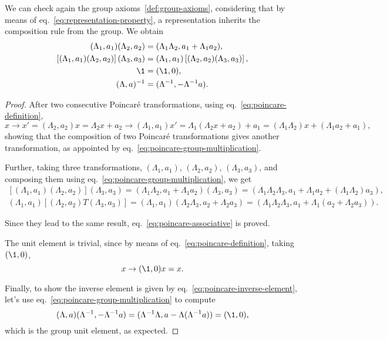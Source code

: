 We can check again the group axioms~\ref{def:group-axioms}, considering that by means of eq.~\eqref{eq:representation-property}, a representation inherits the composition rule from the group. We obtain
\begin{subequations}
\begin{align}
    (\Lambda_1, a_1) (\Lambda_2, a_2) &= (\Lambda_1 \Lambda_2, a_1 + \Lambda_1 a_2), \label{eq:poincare-group-multiplication} \\
    \left[(\Lambda_1,a_1)(\Lambda_2,a_2)\right] (\Lambda_3,a_3) &= (\Lambda_1, a_1) \left[ (\Lambda_2,a_2)(\Lambda_3,a_3) \right], \label{eq:poincare-associative} \\
    \1 &= (\1, 0) ,\label{eq:poincare-unit-element} \\
    (\Lambda, a)^{-1} &= (\Lambda^{-1}, -\Lambda^{-1}a). \label{eq:poincare-inverse-element}
\end{align}
\end{subequations}
\begin{proof}
    After two consecutive Poincaré transformations, using eq.~\eqref{eq:poincare-definition},
    \begin{equation*}
        x \to x' = (\Lambda_2,a_2)x = \Lambda_2 x + a_2 \to (\Lambda_1,a_1) x' = \Lambda_1 (\Lambda_2 x + a_2) + a_1 = (\Lambda_1 \Lambda_2) x + (\Lambda_1 a_2 + a_1) ,
    \end{equation*}
    showing that the composition of two Poincaré transformations gives another transformation, as appointed by eq.~\eqref{eq:poincare-group-multiplication}.

    Further, taking three transformations, $(\Lambda_1,a_1)$, $(\Lambda_2,a_2)$, $(\Lambda_3,a_3)$, and composing them using eq.~\eqref{eq:poincare-group-multiplication}, we get
    \begin{gather*}
        \left[ (\Lambda_1,a_1)(\Lambda_2,a_2) \right] (\Lambda_3,a_3) = (\Lambda_1\Lambda_2, a_1 + \Lambda_1 a_2) (\Lambda_3,a_3) = (\Lambda_1\Lambda_2\Lambda_3, a_1 + \Lambda_1 a_2 + (\Lambda_1 \Lambda_2)a_3) , \\
        (\Lambda_1,a_1)\left[(\Lambda_2,a_2)T(\Lambda_3,a_3)\right] = (\Lambda_1,a_1) (\Lambda_2\Lambda_3, a_2 + \Lambda_2 a_3) = (\Lambda_1\Lambda_2\Lambda_3, a_1+\Lambda_1(a_2 + \Lambda_2 a_3)) .
    \end{gather*}
 
    Since they lead to the same result, eq.~\eqref{eq:poincare-associative} is proved.

    The unit element is trivial, since by means of eq.~\eqref{eq:poincare-definition}, taking $(\1,0)$,
    \begin{equation*}
        x \to (\1,0) x = x.
    \end{equation*}

    Finally, to show the inverse element is given by eq.~\eqref{eq:poincare-inverse-element}, let's use eq.~\eqref{eq:poincare-group-multiplication} to compute
    \begin{equation*}
       (\Lambda,a) (\Lambda^{-1}, -\Lambda^{-1}a) = (\Lambda^{-1}\Lambda, a - \Lambda(\Lambda^{-1}a)) = (\1,0),
    \end{equation*}
    which is the group unit element, as expected.
\end{proof}


